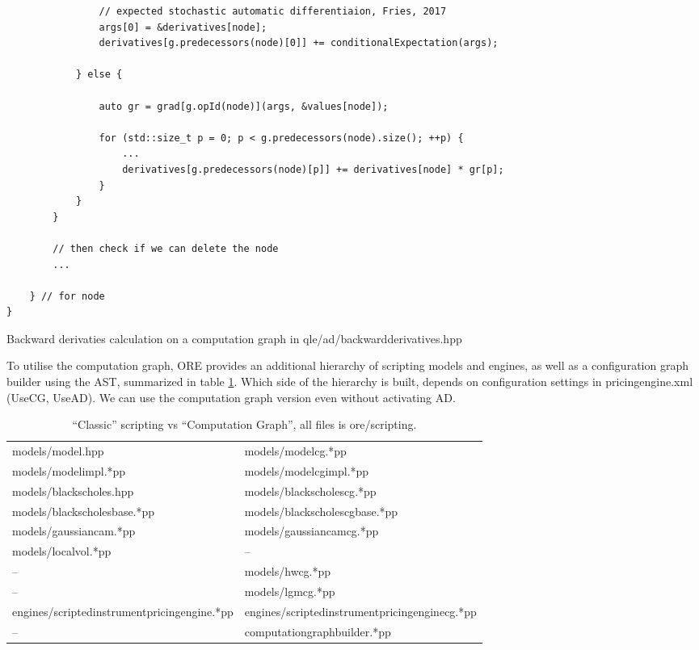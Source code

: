 \begin{listing}
\begin{verbatim}
                // expected stochastic automatic differentiaion, Fries, 2017
                args[0] = &derivatives[node];
                derivatives[g.predecessors(node)[0]] += conditionalExpectation(args);

            } else {

                auto gr = grad[g.opId(node)](args, &values[node]);

                for (std::size_t p = 0; p < g.predecessors(node).size(); ++p) {
                    ...
                    derivatives[g.predecessors(node)[p]] += derivatives[node] * gr[p];
                }
            }
        }

        // then check if we can delete the node
        ...

    } // for node
}
\end{verbatim}
\caption{Backward derivaties calculation on a computation graph in qle/ad/backwardderivatives.hpp}
\label{lst:backwardderivatives}
\end{listing}

To utilise the computation graph, ORE provides an additional hierarchy of scripting models and
engines, as well as a configuration graph builder using the AST, summarized in table \ref{tab:cg}.
Which side of the hierarchy is built, depends on configuration settings in pricingengine.xml
(UseCG, UseAD). We can use the computation graph version even without activating AD.

\begin{table}[htb]
  \scriptsize
  \begin{tabular}{|l|l|}
    \hline
    models/model.hpp &
    models/model{\color{red}cg}.*pp \\
    models/modelimpl.*pp &
    models/model{\color{red}cg}impl.*pp \\
    models/blackscholes.hpp &
    models/blackscholes{\color{red}cg}.*pp \\
    models/blackscholesbase.*pp &
    models/blackscholes{\color{red}cg}base.*pp \\
    models/gaussiancam.*pp &
    models/gaussiancam{\color{red}cg}.*pp \\
    models/localvol.*pp & -- \\
    -- & models/hw{\color{red}cg}.*pp \\
    -- & models/lgm{\color{red}cg}.*pp \\
    \hline
    engines/scriptedinstrumentpricingengine.*pp &
    engines/scriptedinstrumentpricingengine{\color{red}cg}.*pp \\
    \hline
    -- & computationgraphbuilder.*pp \\
    \hline
\end{tabular}
\caption{``Classic'' scripting vs ``Computation Graph'', all files is ore/scripting.}
\label{tab:cg}
\end{table}

